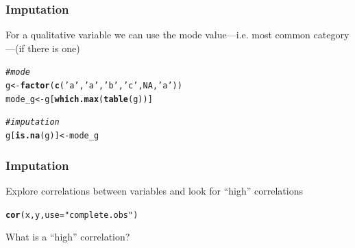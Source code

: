 \documentclass[12pt]{beamer}\usepackage[]{graphicx}\usepackage[]{color}
\makeatletter
\newcommand{\hlnum}[1]{\textcolor[rgb]{0.686,0.059,0.569}{#1}}%
\newcommand{\hlstr}[1]{\textcolor[rgb]{0.192,0.494,0.8}{#1}}%
\newcommand{\hlcom}[1]{\textcolor[rgb]{0.678,0.584,0.686}{\textit{#1}}}%
\newcommand{\hlstd}[1]{\textcolor[rgb]{0.345,0.345,0.345}{#1}}%
\newcommand{\hlkwb}[1]{\textcolor[rgb]{0.69,0.353,0.396}{#1}}%
\newcommand{\hlkwc}[1]{\textcolor[rgb]{0.333,0.667,0.333}{#1}}%
\newcommand{\hlkwd}[1]{\textcolor[rgb]{0.737,0.353,0.396}{\textbf{#1}}}%
\newenvironment{kframe}{%
 \def\at@end@of@kframe{}%
 \ifinner\ifhmode%
  \def\at@end@of@kframe{\end{minipage}}%
  \begin{minipage}{\columnwidth}%
 \fi\fi%
 \def\FrameCommand##1{\hskip\@totalleftmargin \hskip-\fboxsep
 \colorbox{shadecolor}{##1}\hskip-\fboxsep
     \hskip-\linewidth \hskip-\@totalleftmargin \hskip\columnwidth}%
 \MakeFramed {\advance\hsize-\width
   \@totalleftmargin\z@ \linewidth\hsize
   \@setminipage}}%
 {\par\unskip\endMakeFramed%
 \at@end@of@kframe}
\newenvironment{knitrout}{}{} %
\makeatother
\begin{document}

\begin{frame}[fragile]
\frametitle{Imputation}

For a qualitative variable we can use the mode value---i.e. most common category---(if there is one)
\begin{knitrout}\footnotesize
{}\color{fgcolor}\begin{kframe}
\begin{alltt}
\hlcom{# mode}
\hlstd{g} \hlkwb{<-} \hlkwd{factor}\hlstd{(}\hlkwd{c}\hlstd{(}\hlstr{'a'}\hlstd{,} \hlstr{'a'}\hlstd{,} \hlstr{'b'}\hlstd{,} \hlstr{'c'}\hlstd{,} \hlnum{NA}\hlstd{,} \hlstr{'a'}\hlstd{))}
\hlstd{mode_g} \hlkwb{<-} \hlstd{g[}\hlkwd{which.max}\hlstd{(}\hlkwd{table}\hlstd{(g))]}

\hlcom{# imputation}
\hlstd{g[}\hlkwd{is.na}\hlstd{(g)]} \hlkwb{<-} \hlstd{mode_g}
\end{alltt}
\end{kframe}
\end{knitrout}

\end{frame}


\begin{frame}
\frametitle{Imputation}

Explore correlations between variables and look for ``high'' correlations
\eb
\begin{knitrout}\footnotesize
{}\color{fgcolor}\begin{kframe}
\begin{alltt}
\hlkwd{cor}\hlstd{(x, y,} \hlkwc{use} \hlstd{=} \hlstr{"complete.obs"}\hlstd{)}
\end{alltt}
\end{kframe}
\end{knitrout}

{\footnotesize What is a ``high'' correlation?}
\end{frame}

\end{document}

